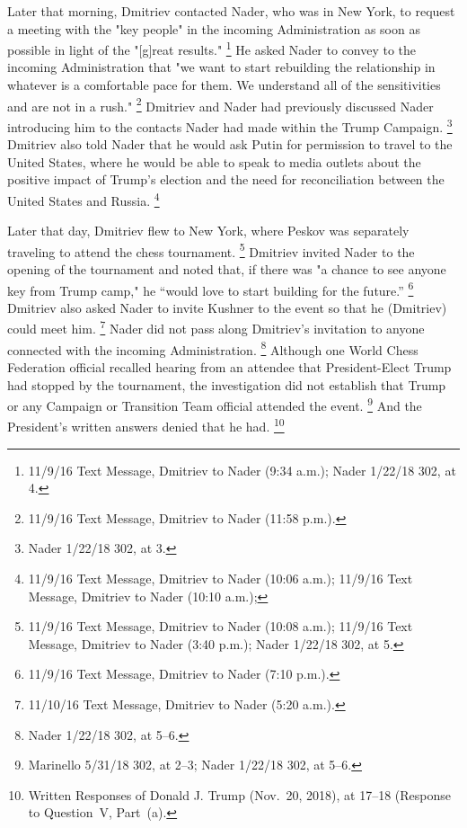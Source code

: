 Later that morning, Dmitriev contacted Nader, who was in New York, to request a meeting with the "key people" in the incoming Administration as soon as possible in light of the "[g]reat results."%
\footnote{11/9/16 Text Message, Dmitriev to Nader (9:34 a.m.);
Nader 1/22/18 302, at 4.}
He asked Nader to convey to the incoming Administration that "we want to start rebuilding the relationship in whatever is a comfortable pace for them.
We understand all of the sensitivities and are not in a rush."%
\footnote{11/9/16 Text Message, Dmitriev to Nader (11:58 p.m.).}
Dmitriev and Nader had previously discussed Nader introducing him to the contacts Nader had made within the Trump Campaign.%
\footnote{Nader 1/22/18 302, at 3.}
Dmitriev also told Nader that he would ask Putin for permission to travel to the United States, where he would be able to speak to media outlets about the positive impact of Trump's election and the need for reconciliation between the United States and Russia.%
\footnote{11/9/16 Text Message, Dmitriev to Nader (10:06 a.m.);
11/9/16 Text Message, Dmitriev to Nader (10:10 a.m.);
}

Later that day, Dmitriev flew to New York, where Peskov was separately traveling to attend the chess tournament.%
\footnote{11/9/16 Text Message, Dmitriev to Nader (10:08 a.m.);
11/9/16 Text Message, Dmitriev to Nader (3:40 p.m.);
Nader 1/22/18 302, at 5.}
Dmitriev invited Nader to the opening of the tournament and noted that, if there was "a chance to see anyone key from Trump camp," he ``would love to start building for the future.''%
\footnote{11/9/16 Text Message, Dmitriev to Nader (7:10 p.m.).}
Dmitriev also asked Nader to invite Kushner to the event so that he (Dmitriev) could meet him.%
\footnote{11/10/16 Text Message, Dmitriev to Nader (5:20 a.m.).}
Nader did not pass along Dmitriev's invitation to anyone connected with the incoming Administration.%
\footnote{Nader 1/22/18 302, at 5--6.}
Although one World Chess Federation official recalled hearing from an attendee that President-Elect Trump had stopped by the tournament, the investigation did not establish that Trump or any Campaign or Transition Team official attended the event.%
\footnote{Marinello 5/31/18 302, at 2--3;
Nader 1/22/18 302, at 5--6.}
And the President's written answers denied that he had.%
\footnote{Written Responses of Donald J. Trump (Nov.~20, 2018), at 17--18 (Response to Question~V, Part~(a).}


